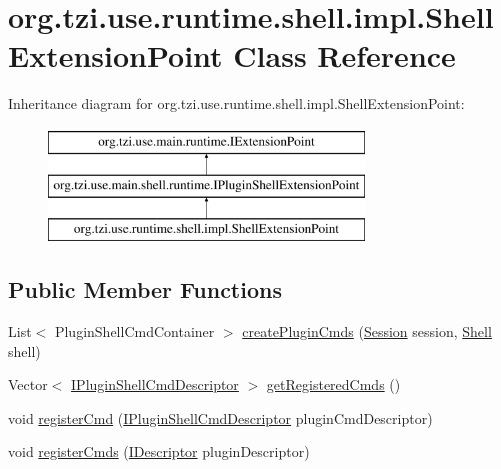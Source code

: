 \hypertarget{classorg_1_1tzi_1_1use_1_1runtime_1_1shell_1_1impl_1_1_shell_extension_point}{\section{org.\-tzi.\-use.\-runtime.\-shell.\-impl.\-Shell\-Extension\-Point Class Reference}
\label{classorg_1_1tzi_1_1use_1_1runtime_1_1shell_1_1impl_1_1_shell_extension_point}
}
Inheritance diagram for org.\-tzi.\-use.\-runtime.\-shell.\-impl.\-Shell\-Extension\-Point\-:\begin{figure}[H]
\begin{center}
\leavevmode
\includegraphics[height=3.000000cm]{classorg_1_1tzi_1_1use_1_1runtime_1_1shell_1_1impl_1_1_shell_extension_point}
\end{center}
\end{figure}
\subsection*{Public Member Functions}
\begin{DoxyCompactItemize}
\item 
List$<$ Plugin\-Shell\-Cmd\-Container $>$ \hyperlink{classorg_1_1tzi_1_1use_1_1runtime_1_1shell_1_1impl_1_1_shell_extension_point_a372103db732a755b8211386ef7f920a1}{create\-Plugin\-Cmds} (\hyperlink{classorg_1_1tzi_1_1use_1_1main_1_1_session}{Session} session, \hyperlink{classorg_1_1tzi_1_1use_1_1main_1_1shell_1_1_shell}{Shell} shell)
\item 
Vector$<$ \hyperlink{interfaceorg_1_1tzi_1_1use_1_1runtime_1_1shell_1_1_i_plugin_shell_cmd_descriptor}{I\-Plugin\-Shell\-Cmd\-Descriptor} $>$ \hyperlink{classorg_1_1tzi_1_1use_1_1runtime_1_1shell_1_1impl_1_1_shell_extension_point_acb11fbfc485cc44f07b367c913fced6e}{get\-Registered\-Cmds} ()
\item 
void \hyperlink{classorg_1_1tzi_1_1use_1_1runtime_1_1shell_1_1impl_1_1_shell_extension_point_a42a80942359184d0be85bcdfbb27d033}{register\-Cmd} (\hyperlink{interfaceorg_1_1tzi_1_1use_1_1runtime_1_1shell_1_1_i_plugin_shell_cmd_descriptor}{I\-Plugin\-Shell\-Cmd\-Descriptor} plugin\-Cmd\-Descriptor)
\item 
void \hyperlink{classorg_1_1tzi_1_1use_1_1runtime_1_1shell_1_1impl_1_1_shell_extension_point_a45cc3123d55ad39c72e18a4eb287d52f}{register\-Cmds} (\hyperlink{interfaceorg_1_1tzi_1_1use_1_1main_1_1runtime_1_1_i_descriptor}{I\-Descriptor} plugin\-Descriptor)
\end{DoxyCompactItemize}
